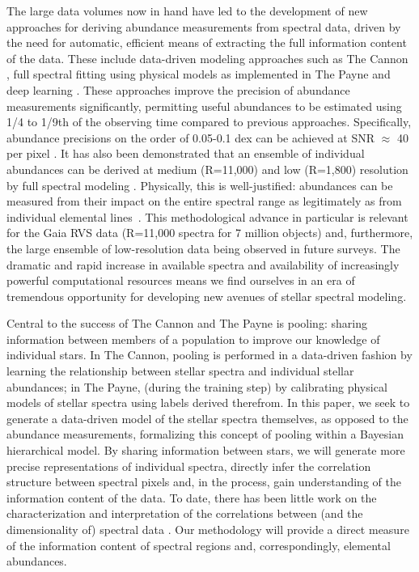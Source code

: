 \documentclass[a4paper,fleqn,usenatbib]{mnras}
\begin{document}
The large data volumes now in hand have led to the development of new approaches for deriving abundance measurements from spectral data, driven by the need for automatic, efficient means of extracting the full information content of the data. These include data-driven modeling approaches such as The Cannon \citep{Ness2015}, full spectral fitting using physical models as implemented in The Payne \citep{Ting2018} and  deep learning \citep{Leung2019}. These approaches improve the precision of abundance measurements significantly, permitting useful abundances to be estimated using 1/4 to 1/9th of the observing time compared to previous approaches. Specifically, abundance precisions on the order of 0.05-0.1 dex can be achieved at SNR $\approx$ 40 per pixel \citep{Ho2017b,Ness2018,Ting2018, Leung2019}. It has also been demonstrated that an ensemble of individual abundances can be derived at medium (R=11,000) and low (R=1,800) resolution by full spectral modeling \citep[e.g.][and Wheeler et al., in prep.]{Casey2016,Ting2017}. Physically, this is well-justified: abundances can be measured from their impact on the entire spectral range as legitimately as from individual elemental lines~\citep[e.g.][]{Ting2018}. This methodological advance in particular is relevant for the Gaia RVS data (R=11,000 spectra for 7 million objects) and, furthermore, the large ensemble of low-resolution data being observed in future surveys. The dramatic and rapid increase in available spectra and availability of increasingly powerful computational resources means we find ourselves in an era of tremendous opportunity for developing new avenues of stellar spectral modeling.

Central to the success of The Cannon and The Payne is pooling: sharing information between members of a population to improve our knowledge of individual stars. In The Cannon, pooling is performed in a data-driven fashion by learning the relationship between stellar spectra and individual stellar abundances; in The Payne, (during the training step) by calibrating physical models of stellar spectra using labels derived therefrom. In this paper, we seek to generate a data-driven model of the stellar spectra themselves, as opposed to the abundance measurements, formalizing this concept of pooling within a Bayesian hierarchical model. By sharing information between stars, we will generate more precise representations of individual spectra, directly infer the correlation structure between spectral pixels and, in the process, gain understanding of the information content of the data. To date, there has been little work on the characterization and interpretation of the correlations between (and the dimensionality of) spectral data \citep[see however][]{Ting2012, PJ2019, M2014, Casey2019}. Our methodology will provide a direct measure of the information content of spectral regions and, correspondingly, elemental abundances.
 
\end{document}
